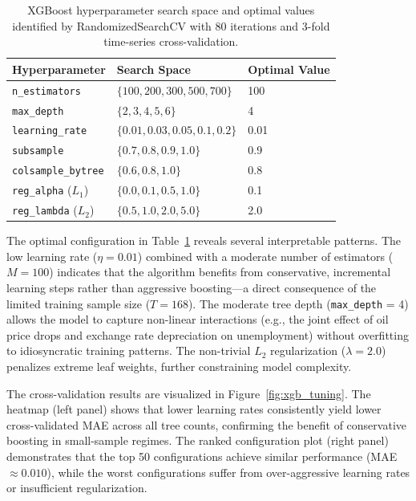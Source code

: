 \documentclass[14pt, a4paper]{extarticle}
\begin{document}
\begin{table}[H]
\centering
\caption{XGBoost hyperparameter search space and optimal values identified by RandomizedSearchCV with 80 iterations and 3-fold time-series cross-validation.}
\label{tab:xgb_tuning}
\begin{tabular}{@{}lll@{}}
\toprule
\textbf{Hyperparameter} & \textbf{Search Space} & \textbf{Optimal Value} \\
\midrule
\texttt{n\_estimators}    & $\{100, 200, 300, 500, 700\}$       & 100 \\
\texttt{max\_depth}       & $\{2, 3, 4, 5, 6\}$                 & 4 \\
\texttt{learning\_rate}   & $\{0.01, 0.03, 0.05, 0.1, 0.2\}$    & 0.01 \\
\texttt{subsample}        & $\{0.7, 0.8, 0.9, 1.0\}$            & 0.9 \\
\texttt{colsample\_bytree}& $\{0.6, 0.8, 1.0\}$                 & 0.8 \\
\texttt{reg\_alpha} ($L_1$)& $\{0.0, 0.1, 0.5, 1.0\}$           & 0.1 \\
\texttt{reg\_lambda} ($L_2$)& $\{0.5, 1.0, 2.0, 5.0\}$          & 2.0 \\
\bottomrule
\end{tabular}
\end{table}

The optimal configuration in Table~\ref{tab:xgb_tuning} reveals several interpretable patterns. The low learning rate ($\eta = 0.01$) combined with a moderate number of estimators ($M = 100$) indicates that the algorithm benefits from conservative, incremental learning steps rather than aggressive boosting---a direct consequence of the limited training sample size ($T = 168$). The moderate tree depth (\texttt{max\_depth} = 4) allows the model to capture non-linear interactions (e.g., the joint effect of oil price drops and exchange rate depreciation on unemployment) without overfitting to idiosyncratic training patterns. The non-trivial $L_2$ regularization ($\lambda = 2.0$) penalizes extreme leaf weights, further constraining model complexity.

The cross-validation results are visualized in Figure~\ref{fig:xgb_tuning}. The heatmap (left panel) shows that lower learning rates consistently yield lower cross-validated MAE across all tree counts, confirming the benefit of conservative boosting in small-sample regimes. The ranked configuration plot (right panel) demonstrates that the top 50 configurations achieve similar performance (MAE $\approx 0.010$), while the worst configurations suffer from over-aggressive learning rates or insufficient regularization.
\end{document}
